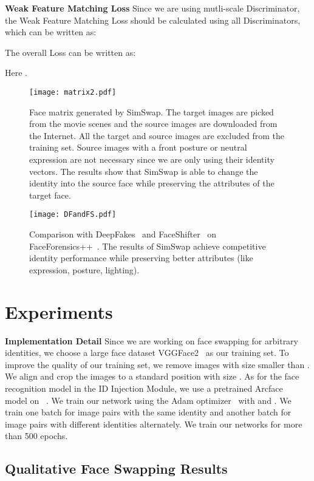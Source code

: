 \documentclass[sigconf]{acmart}
\begin{document}
\noindent\textbf{Weak Feature Matching Loss} Since we are using mutli-scale Discriminator, the Weak Feature Matching Loss should be calculated using all Discriminators, which can be written as:


The overall Loss can be written as:

Here .

\begin{figure*}[!ht] 
\centering
\texttt{[image: matrix2.pdf]}
\caption{Face matrix generated by SimSwap. The target images are picked from the movie scenes and the source images are downloaded from the Internet. All the target and source images are excluded from the training set. Source images with a front posture or neutral expression are not necessary since we are only using their identity vectors. The results show that SimSwap is able to change the identity into the source face while preserving the attributes of the target face.}
\label{fig:Matrix}
\end{figure*}

\begin{figure}
\centering
\texttt{[image: DFandFS.pdf]}
\caption{Comparison with DeepFakes~\cite{DeepFakes} and FaceShifter~\cite{DBLP:FaceShifter} on FaceForensics++~\cite{DBLP:faceforensics}. The results of SimSwap achieve competitive identity performance while preserving better attributes (like expression, posture, lighting).}
\label{fig:DeepFakes}
\end{figure}


\section{Experiments}
\textbf{Implementation Detail} Since we are working on face swapping for arbitrary identities, we choose a large face dataset VGGFace2~\cite{DBLP:vggface} as our training set. To improve the quality of our training set, we remove images with size smaller than . We align and crop the images to a standard position with size . As for the face recognition model in the ID Injection Module, we use a pretrained Arcface~\cite{DBLP:ArcFace} model on ~\cite{ArcFace_github}. We train our network using the Adam optimizer~\cite{DBLP:Adam} with  and . We train one batch for image pairs with the same identity and another batch for image pairs with different identities alternately. We train our networks for more than 500 epochs.

\subsection{Qualitative Face Swapping Results}
\end{document}

